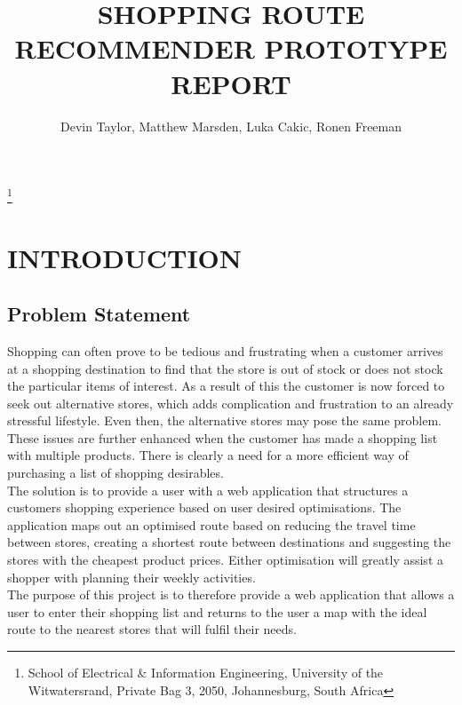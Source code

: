 \documentclass[10pt,twocolumn]{witseiepaper}
\begin{document}
	
	

\title{SHOPPING ROUTE RECOMMENDER PROTOTYPE REPORT}

\author{Devin Taylor, Matthew Marsden, Luka Cakic, Ronen Freeman}
\thanks{School of Electrical \& Information Engineering, University of the
	Witwatersrand, Private Bag 3, 2050, Johannesburg, South Africa}



\abstract{}

\keywords{}


\maketitle

\section{INTRODUCTION}

	\subsection{Problem Statement} 
	
		Shopping can often prove to be tedious and frustrating when a customer arrives at a shopping destination to find that the store is out of stock or does not stock the particular items of interest. As a result of this the customer is now forced to seek out alternative stores, which adds complication and frustration to an already stressful lifestyle. Even then, the alternative stores may pose the same problem. These issues are further enhanced when the customer has made a shopping list with multiple products. There is clearly a need for a more efficient way of purchasing a list of shopping desirables. \\
		
		The solution is to provide a user with a web application that structures a customers shopping experience based on user desired optimisations. The application maps out an optimised route based on reducing the travel time between stores, creating a shortest route between destinations and suggesting the stores with the cheapest product prices. Either optimisation will greatly assist a shopper with planning their weekly activities. \\
		
		The purpose of this project is to therefore provide a web application that allows a user to enter their shopping list and returns to the user a map with the ideal route to the nearest stores that will fulfil their needs. 
\end{document}
